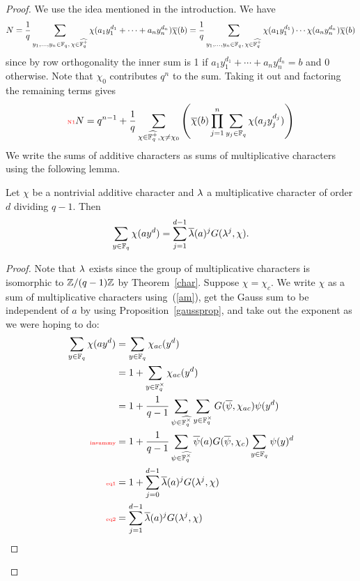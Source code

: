 \begin{proof}
We use the idea mentioned in the introduction. We have %
\[
N=\frac{1}{q}\sum_{y_1,\ldots, y_n\in \mathbb{F}_q,\,\chi\in \widehat{\mathbb{F}_q^+}} \chi(a_1y_1^{d_1}+\cdots +a_ny_n^{d_n})\overline{\chi}(b)=\frac{1}{q}\sum_{y_1,\ldots, y_n\in \mathbb{F}_q,\,\chi\in \widehat{\mathbb{F}_q^+}} \chi(a_1y_1^{d_1})\cdots \chi(a_ny_n^{d_n})\overline{\chi}(b)
\]
since by row orthogonality the inner sum is 1 if $a_1y_1^{d_1}+\cdots +a_ny_n^{d_n}=b$ and 0 otherwise. Note that $\chi_0$ contributes $q^n$ to the sum. Taking it out and factoring the remaining terms gives
\begin{equation}\llabel{N1}
N=q^{n-1}+\rc{q}\sum_{\chi\in \widehat{\F_q^+}, \chi\neq \chi_0}\pa{\overline{\chi}(b)\prod_{j=1}^n\sum_{y_j\in \F_q}\chi(a_jy_j^{d_j})}
\end{equation}
We write the sums of additive characters as sums of multiplicative characters using the following lemma.
\begin{lem}
Let $\chi$ be a nontrivial additive character and $\lambda$ a multiplicative character of order $d$ dividing $q-1$. Then
\[\sum_{y\in \mathbb{F}_q}\chi(ay^d)=\sum_{j=1}^{d-1}\overline{\lambda}(a)^jG(\lambda^j,\chi).\]
\end{lem}
\begin{proof}
Note that $\lambda$ exists since the group of multiplicative characters is isomorphic to $\mathbb{Z}/(q-1)\mathbb{Z}$ by Theorem~\ref{char}. Suppose $\chi=\chi_c$. We write $\chi$ as a sum of multiplicative characters using~(\ref{am}), get the Gauss sum to be independent of $a$ by using Proposition~\ref{gaussprop}, and take out the exponent as we were hoping to do:
\begin{align}
\nonumber
\sum_{y\in \F_q}\chi(ay^d)&=\sum_{y\in \F_q}\chi_{ac}(y^d)\\
\nonumber
&=1+\sum_{y\in \F_q^{\times}}\chi_{ac}(y^d)\\
\nonumber
&=1+
\rc{q-1}\sum_{\psi\in \widehat{\F_q^{\times}}} \sum_{y\in \F_q^{\times}}G(\overline{\psi},\chi_{ac})\psi(y^d)\\
\llabel{insummy}&=1+\rc{q-1}\sum_{\psi\in \widehat{\F_q^{\times}}} \overline{\psi}(a)G(\overline{\psi},\chi_c)\sum_{y\in \F_q}\psi(y)^d\\
\llabel{eq1}
&=1+\sum_{j=0}^{d-1}\overline{\la}(a)^jG(\la^j,\chi)\\
\llabel{eq2}
&=\sum_{j=1}^{d-1}\overline{\la}(a)^jG(\la^j,\chi)

\end{align}
\end{proof}
\end{proof}
